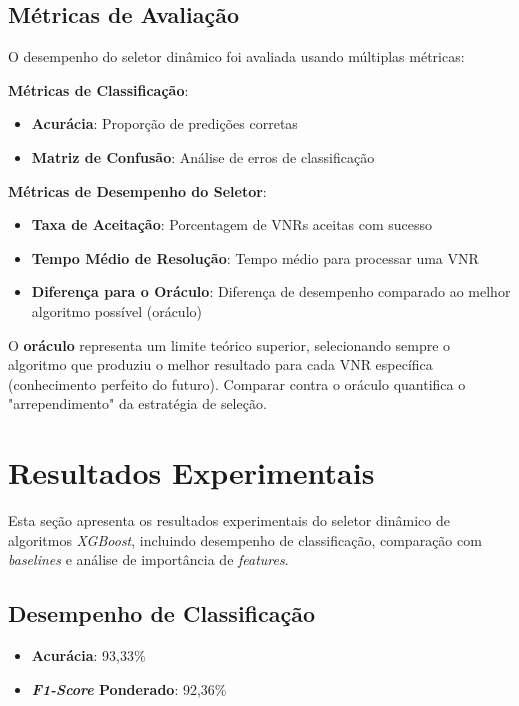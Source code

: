 \documentclass[conference]{IEEEtran}
\begin{document}
\subsection{Métricas de Avaliação}

O desempenho do seletor dinâmico foi avaliada usando múltiplas métricas:

\textbf{Métricas de Classificação}:
\begin{itemize}
    \item \textbf{Acurácia}: Proporção de predições corretas
    \item \textbf{Matriz de Confusão}: Análise de erros de classificação
\end{itemize}

\textbf{Métricas de Desempenho do Seletor}:
\begin{itemize}
    \item \textbf{Taxa de Aceitação}: Porcentagem de VNRs aceitas com sucesso
    \item \textbf{Tempo Médio de Resolução}: Tempo médio para processar uma VNR
    \item \textbf{Diferença para o Oráculo}: Diferença de desempenho comparado ao melhor algoritmo possível (oráculo)
\end{itemize}

O \textbf{oráculo} representa um limite teórico superior, selecionando sempre o algoritmo que produziu o melhor resultado para cada VNR específica (conhecimento perfeito do futuro). Comparar contra o oráculo quantifica o "arrependimento" da estratégia de seleção.

\section{Resultados Experimentais}
\label{sec:Results}

Esta seção apresenta os resultados experimentais do seletor dinâmico de algoritmos \textit{XGBoost}, incluindo desempenho de classificação, comparação com \textit{baselines} e análise de importância de \textit{features}.

\subsection{Desempenho de Classificação}

\begin{itemize}
    \item \textbf{Acurácia}: 93,33\%
    \item \textbf{\textit{F1-Score} Ponderado}: 92,36\%
\end{itemize}
\end{document}
